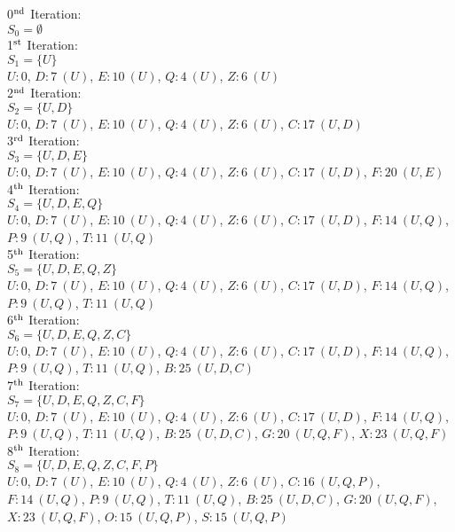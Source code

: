 0$\rm^{nd}$ Iteration:\\
$S_0=\emptyset$\\

1$\rm^{st}$ Iteration:\\
$S_{1}=\lbrace U \rbrace$\\
$U:0$, $D:7\ (U)$, $E:10\ (U)$, $Q:4\ (U)$, $Z:6\ (U)$\\

2$\rm^{nd}$ Iteration:\\
$S_{2}=\lbrace U,D \rbrace$\\
$U:0$, $D:7\ (U)$, $E:10\ (U)$, $Q:4\ (U)$, $Z:6\ (U)$, $C:17\ (U,D)$\\

3$\rm^{rd}$ Iteration:\\
$S_{3}=\lbrace U,D,E \rbrace$\\
$U:0$, $D:7\ (U)$, $E:10\ (U)$, $Q:4\ (U)$, $Z:6\ (U)$, $C:17\ (U,D)$, $F:20\ (U,E)$\\

4$\rm^{th}$ Iteration:\\
$S_{4}=\lbrace U,D,E,Q \rbrace$\\
$U:0$, $D:7\ (U)$, $E:10\ (U)$, $Q:4\ (U)$, $Z:6\ (U)$, $C:17\ (U,D)$, $F:14\ (U,Q)$, $P:9\ (U,Q)$, $T:11\ (U,Q)$\\

5$\rm^{th}$ Iteration:\\
$S_{5}=\lbrace U,D,E,Q,Z \rbrace$\\
$U:0$, $D:7\ (U)$, $E:10\ (U)$, $Q:4\ (U)$, $Z:6\ (U)$, $C:17\ (U,D)$, $F:14\ (U,Q)$, $P:9\ (U,Q)$, $T:11\ (U,Q)$\\

6$\rm^{th}$ Iteration:\\
$S_{6}=\lbrace U,D,E,Q,Z,C \rbrace$\\
$U:0$, $D:7\ (U)$, $E:10\ (U)$, $Q:4\ (U)$, $Z:6\ (U)$, $C:17\ (U,D)$, $F:14\ (U,Q)$, $P:9\ (U,Q)$, $T:11\ (U,Q)$, $B:25\ (U,D,C)$\\

7$\rm^{th}$ Iteration:\\
$S_{7}=\lbrace U,D,E,Q,Z,C,F \rbrace$\\
$U:0$, $D:7\ (U)$, $E:10\ (U)$, $Q:4\ (U)$, $Z:6\ (U)$, $C:17\ (U,D)$, $F:14\ (U,Q)$, $P:9\ (U,Q)$, $T:11\ (U,Q)$, $B:25\ (U,D,C)$, $G:20\ (U,Q,F)$, $X:23\ (U,Q,F)$\\

8$\rm^{th}$ Iteration:\\
$S_{8}=\lbrace U,D,E,Q,Z,C,F,P \rbrace$\\
$U:0$, $D:7\ (U)$, $E:10\ (U)$, $Q:4\ (U)$, $Z:6\ (U)$, $C:16\ (U,Q,P)$, $F:14\ (U,Q)$, $P:9\ (U,Q)$, $T:11\ (U,Q)$, $B:25\ (U,D,C)$, $G:20\ (U,Q,F)$, $X:23\ (U,Q,F)$, $O:15\ (U,Q,P)$, $S:15\ (U,Q,P)$\\

